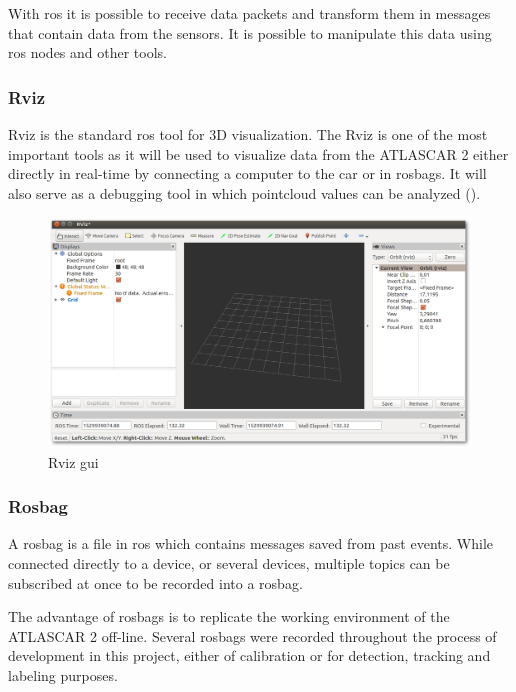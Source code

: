 With \gls{ros} it is possible to receive data packets and transform them in messages that contain data from the sensors. It is possible to manipulate this data using \gls{ros} nodes and other tools. 

\subsubsection{Rviz}
Rviz is the standard \gls{ros} tool for 3D visualization. The Rviz is one of the most important tools as it will be used to visualize data from the ATLASCAR 2 either directly in real-time by connecting a computer to the car or in rosbags. It will also serve as a debugging tool in which pointcloud values can be analyzed (\cite{ROSWiki}).

\begin{figure}[htp]
	
	\centering
	\includegraphics[width=.99\textwidth]{capexp/imgs/rviz.png}
	
	\caption{Rviz \gls{gui}}
	\label{fig:rviz}
	
\end{figure}

\subsubsection{Rosbag}

A rosbag is a file in \gls{ros} which contains messages saved from past events. While connected directly to a device, or several devices, multiple topics can be subscribed at once to be recorded into a rosbag. 

The advantage of rosbags is to replicate the working environment of the ATLASCAR 2 off-line. Several rosbags were recorded throughout the process of development in this project, either of calibration or for detection, tracking and labeling purposes. 

